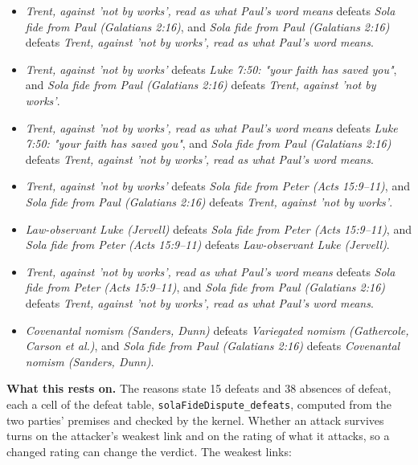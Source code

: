 \documentclass[11pt]{article}
\begin{document}
\begin{itemize}
\begin{itemize}
\item \emph{Trent, against 'not by works', read as what Paul's word means} defeats \emph{Sola fide from Paul (Galatians 2:16)}, and \emph{Sola fide from Paul (Galatians 2:16)} defeats \emph{Trent, against 'not by works', read as what Paul's word means}.
\item \emph{Trent, against 'not by works'} defeats \emph{Luke 7:50: "your faith has saved you"}, and \emph{Sola fide from Paul (Galatians 2:16)} defeats \emph{Trent, against 'not by works'}.
\item \emph{Trent, against 'not by works', read as what Paul's word means} defeats \emph{Luke 7:50: "your faith has saved you"}, and \emph{Sola fide from Paul (Galatians 2:16)} defeats \emph{Trent, against 'not by works', read as what Paul's word means}.
\item \emph{Trent, against 'not by works'} defeats \emph{Sola fide from Peter (Acts 15:9–11)}, and \emph{Sola fide from Paul (Galatians 2:16)} defeats \emph{Trent, against 'not by works'}.
\item \emph{Law-observant Luke (Jervell)} defeats \emph{Sola fide from Peter (Acts 15:9–11)}, and \emph{Sola fide from Peter (Acts 15:9–11)} defeats \emph{Law-observant Luke (Jervell)}.
\item \emph{Trent, against 'not by works', read as what Paul's word means} defeats \emph{Sola fide from Peter (Acts 15:9–11)}, and \emph{Sola fide from Paul (Galatians 2:16)} defeats \emph{Trent, against 'not by works', read as what Paul's word means}.
\item \emph{Covenantal nomism (Sanders, Dunn)} defeats \emph{Variegated nomism (Gathercole, Carson et al.)}, and \emph{Sola fide from Paul (Galatians 2:16)} defeats \emph{Covenantal nomism (Sanders, Dunn)}.
\end{itemize}
\end{itemize}
\par\noindent\textbf{What this rests on.} The reasons state 15 defeats and 38 absences of defeat, each a cell of the defeat table, \texttt{sola\allowbreak{}Fide\allowbreak{}Dispute\_\allowbreak{}defeats}, computed from the two parties' premises and checked by the kernel. Whether an attack survives turns on the attacker's weakest link and on the rating of what it attacks, so a changed rating can change the verdict. The weakest links:
\end{document}
